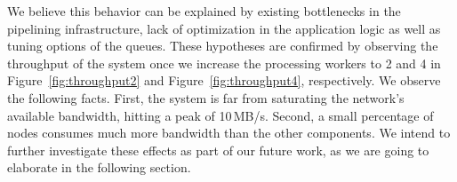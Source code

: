 We believe this behavior can be explained by existing bottlenecks in the pipelining infrastructure, lack of optimization in the application logic as well as tuning options of the \zmq queues.
These hypotheses are confirmed by observing the throughput of the system once we increase the processing workers to 2 and 4 in Figure~\ref{fig:throughput2} and Figure~\ref{fig:throughput4}, respectively.
We observe the following facts.
First, the system is far from saturating the network's available bandwidth, hitting a peak of 10\,MB/s.
Second, a small percentage of nodes consumes much more bandwidth than the other components.
We intend to further investigate these effects as part of our future work, as we are going to elaborate in the following section.



